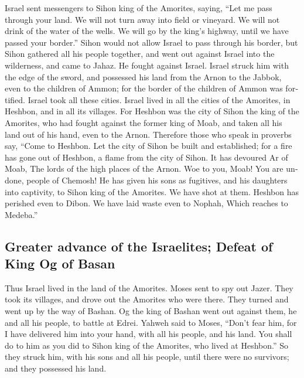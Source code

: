 \begin{paracol}{2}
\begin{otherlanguage}{english}
 Israel sent messengers to Sihon king of the Amorites,
saying,  ``Let me pass through your land. We will not
turn away into field or vineyard. We will not drink of the water of the
wells. We will go by the king's highway, until we have passed your
border.''  Sihon would not allow Israel to pass through
his border, but Sihon gathered all his people together, and went out
against Israel into the wilderness, and came to Jahaz. He fought against
Israel.  Israel struck him with the edge of the sword,
and possessed his land from the Arnon to the Jabbok, even to the
children of Ammon; for the border of the children of Ammon was
fortified.  Israel took all these cities. Israel lived in
all the cities of the Amorites, in Heshbon, and in all its villages.
 For Heshbon was the city of Sihon the king of the
Amorites, who had fought against the former king of Moab, and taken all
his land out of his hand, even to the Arnon.  Therefore
those who speak in proverbs say, ``Come to Heshbon. Let the city of
Sihon be built and established;  for a fire has gone out
of Heshbon, a flame from the city of Sihon. It has devoured Ar of Moab,
The lords of the high places of the Arnon.  Woe to you,
Moab! You are undone, people of Chemosh! He has given his sons as
fugitives, and his daughters into captivity, to Sihon king of the
Amorites.  We have shot at them. Heshbon has perished
even to Dibon. We have laid waste even to Nophah, Which reaches to
Medeba.''

\hypertarget{greater-advance-of-the-israelites-defeat-of-king-og-of-basan}{%
\subsection{Greater advance of the Israelites; Defeat of King Og of
Basan}\label{greater-advance-of-the-israelites-defeat-of-king-og-of-basan}}

 Thus Israel lived in the land of the Amorites.
 Moses sent to spy out Jazer. They took its villages, and
drove out the Amorites who were there.  They turned and
went up by the way of Bashan. Og the king of Bashan went out against
them, he and all his people, to battle at Edrei.  Yahweh
said to Moses, ``Don't fear him, for I have delivered him into your
hand, with all his people, and his land. You shall do to him as you did
to Sihon king of the Amorites, who lived at Heshbon.'' 
So they struck him, with his sons and all his people, until there were
no survivors; and they possessed his land.


\end{otherlanguage}
\end{paracol}

